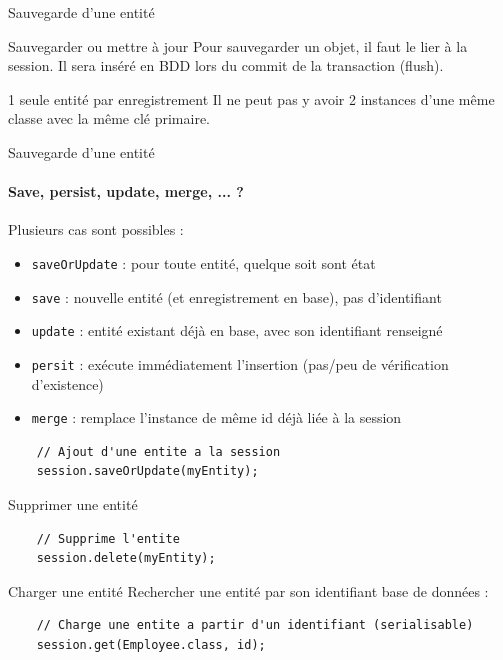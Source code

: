 \documentclass[compact]{beamer}%
\begin{document}
\begin{frame}{Sauvegarde d'une entité}
 	
 	\begin{block}{Sauvegarder ou mettre à jour}
	Pour sauvegarder un objet, il faut le lier à la session. Il sera inséré en BDD lors du commit de la transaction (flush).
	\end{block}
	
	\pause
	\begin{alertblock}{1 seule entité par enregistrement}
	Il ne peut pas y avoir 2 instances d'une même classe avec la même clé primaire.
	\end{alertblock}
	
\end{frame}

\begin{frame}[fragile]{Sauvegarde d'une entité}
 	\framesubtitle{Save, persist, update, merge, ... ?}
 	
	Plusieurs cas sont possibles :
	\begin{itemize}[<+->]
	\item \texttt{saveOrUpdate} : pour toute entité, quelque soit sont état
	\item \texttt{save} : nouvelle entité (et enregistrement en base), pas d'identifiant
	\item \texttt{update} : entité existant déjà en base, avec son identifiant renseigné 
	\item \texttt{persit} : exécute immédiatement l'insertion (pas/peu de vérification d'existence) 
	\item \texttt{merge} : remplace l'instance de même id déjà liée à la session
	\end{itemize}
	
	\begin{lstlisting}
	// Ajout d'une entite a la session
	session.saveOrUpdate(myEntity);
	\end{lstlisting}
	
\end{frame}

\begin{frame}[fragile]{Supprimer une entité}
	
	\begin{lstlisting}
	// Supprime l'entite
	session.delete(myEntity);
	\end{lstlisting}
\end{frame}


\begin{frame}[fragile]{Charger une entité}
	Rechercher une entité par son identifiant base de données :
	\begin{lstlisting}
	// Charge une entite a partir d'un identifiant (serialisable)
	session.get(Employee.class, id);
	\end{lstlisting}
\end{frame}
	
\end{document}
